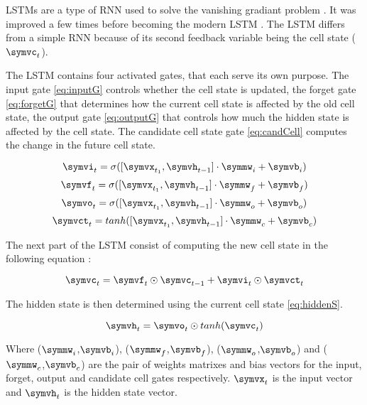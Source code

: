 LSTMs are a type of RNN used to solve the vanishing gradiant problem \cite{firstLSTM}. It was improved a few times before becoming the modern LSTM \cite{improvLSTM}. The LSTM differs from a simple RNN because of its second feedback variable being the cell state ($\symvc_t$).

The LSTM contains four activated gates, that each serve its own purpose. The input gate \cref{eq:inputG} controls whether the cell state is updated, the forget gate \cref{eq:forgetG} that determines how the current cell state is affected by the old cell state, the output gate \cref{eq:outputG} that controls how much the hidden state is affected by the cell state. The candidate cell state gate \cref{eq:candCell} computes the change in the future cell state.

\begin{equation}\label{eq:inputG}
  \symvi_t= \sigma([\symvx_{t_1},\symvh_{t-1}]\cdot \symmw_i + \symvb_i)
\end{equation}
\begin{equation}\label{eq:forgetG}
  \symvf_t= \sigma([\symvx_{t_1},\symvh_{t-1}]\cdot \symmw_f + \symvb_f)
\end{equation}
\begin{equation}\label{eq:outputG}
  \symvo_t= \sigma([\symvx_{t_1},\symvh_{t-1}]\cdot \symmw_o + \symvb_o)
\end{equation}
\begin{equation}\label{eq:candCell}
  \symvct_t=tanh([\symvx_{t_1},\symvh_{t-1}]\cdot \symmw_c+ \symvb_c)
\end{equation}

The next part of the LSTM consist of computing the new cell state in the following equation :

\begin{equation}\label{eq:cellS}
  \symvc_t=\symvf_t\odot \symvc_{t-1} + \symvi_t \odot \symvct_t
\end{equation}

The hidden state is then determined using the current cell state \cref{eq:hiddenS}.

\begin{equation}\label{eq:hiddenS}
  \symvh_t=\symvo_t\odot tanh(\symvc_t)
\end{equation}

Where ($\symmw_i$,$\symvb_i$), ($\symmw_f$,$\symvb_f$), ($\symmw_o$,$\symvb_o$) and ($\symmw_c$,$\symvb_c$) are the pair of weights matrixes and bias vectors for the input, forget, output and candidate cell gates respectively. $\symvx_t$ is the input vector and $\symvh_t$ is the hidden state vector.

